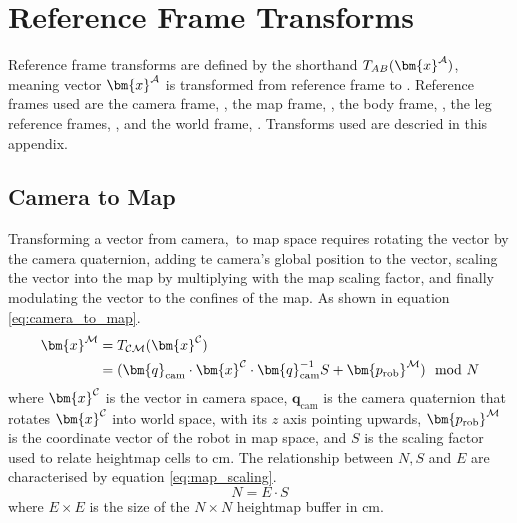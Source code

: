 \chapter{Reference Frame Transforms} \label{app:transforms}
    Reference frame transforms are defined by the shorthand \(\transframe{\bm{x}\inrefframe{A}}{A}{B}\), meaning vector \(\bm{x}\inrefframe{A}\) is transformed
    from reference frame  to . Reference frames used are the camera frame, ,
    the map frame, , the body frame, , the leg reference frames, , and the world frame, . Transforms used are
    descried in this appendix.

    \section{Camera to Map}
        Transforming a vector from camera,\ to map space requires rotating the vector by the camera quaternion, adding
        te camera's global position to the vector, scaling the vector into the map by multiplying with the map scaling
        factor, and finally modulating the vector to the confines of the map. As shown in equation \ref{eq:camera_to_map}.
        \begin{align} \label{eq:camera_to_map}
        \begin{split}
            \bm{x}\inrefframe{\fmap} &= \transframe{\bm{x}\inrefframe{\fcamera}}{\fcamera}{\fmap}\\ 
            &= (\bm{q}_\text{cam} \cdot \bm{x}\inrefframe{\fcamera} \cdot \bm{q}_\text{cam}^{-1}S + \bm{p_\text{rob}}\inrefframe{\fmap}) \mod N
        \end{split}
        \end{align}
        where \(\bm{x}\inrefframe{\fcamera}\) is the vector in camera space, \(\bm{q}_\text{cam}\) is the camera quaternion that rotates \(\bm{x}\inrefframe{\fcamera}\) 
        into world space, with its \(z\) axis pointing upwards, \(\bm{p_\text{rob}}\inrefframe{\fmap}\) is the coordinate vector of the robot in map space, and \(S\) is the scaling factor
        used to relate heightmap cells to cm. The relationship between \(N, S\) and \(E\) are characterised by equation \ref{eq:map_scaling}.
        \begin{equation} \label{eq:map_scaling}
            N = E \cdot S
        \end{equation}
        where \(E\times E\) is the size of the \(N\times N\) heightmap buffer in cm.
    
